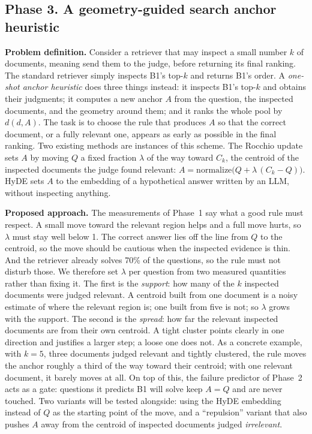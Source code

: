 \documentclass[12pt,a4paper]{article}
\newcommand{\dist}{d}
\begin{document}
\subsection{Phase 3. A geometry-guided search anchor heuristic}

\textbf{Problem definition.} Consider a retriever that may inspect a small number $k$ of documents, meaning send them to the judge, before returning its final ranking. The standard retriever simply inspects B1's top-$k$ and returns B1's order. A \emph{one-shot anchor heuristic} does three things instead: it inspects B1's top-$k$ and obtains their judgments; it computes a new anchor $A$ from the question, the inspected documents, and the geometry around them; and it ranks the whole pool by $\dist(d,A)$. The task is to choose the rule that produces $A$ so that the correct document, or a fully relevant one, appears as early as possible in the final ranking. Two existing methods are instances of this scheme. The Rocchio update sets $A$ by moving $Q$ a fixed fraction $\lambda$ of the way toward $C_k$, the centroid of the inspected documents the judge found relevant: $A=\mathrm{normalize}\bigl(Q+\lambda\,(C_k-Q)\bigr)$. HyDE sets $A$ to the embedding of a hypothetical answer written by an LLM, without inspecting anything.

\textbf{Proposed approach.} The measurements of Phase~1 say what a good rule must respect. A small move toward the relevant region helps and a full move hurts, so $\lambda$ must stay well below 1. The correct answer lies off the line from $Q$ to the centroid, so the move should be cautious when the inspected evidence is thin. And the retriever already solves 70\% of the questions, so the rule must not disturb those. We therefore set $\lambda$ per question from two measured quantities rather than fixing it. The first is the \emph{support}: how many of the $k$ inspected documents were judged relevant. A centroid built from one document is a noisy estimate of where the relevant region is; one built from five is not; so $\lambda$ grows with the support. The second is the \emph{spread}: how far the relevant inspected documents are from their own centroid. A tight cluster points clearly in one direction and justifies a larger step; a loose one does not. As a concrete example, with $k=5$, three documents judged relevant and tightly clustered, the rule moves the anchor roughly a third of the way toward their centroid; with one relevant document, it barely moves at all. On top of this, the failure predictor of Phase~2 acts as a gate: questions it predicts B1 will solve keep $A=Q$ and are never touched. Two variants will be tested alongside: using the HyDE embedding instead of $Q$ as the starting point of the move, and a ``repulsion'' variant that also pushes $A$ away from the centroid of inspected documents judged \emph{irrelevant}.
\end{document}
